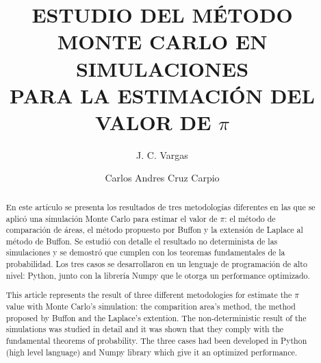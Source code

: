 \documentclass{rbf}
\begin{document}
\title{ESTUDIO DEL MÉTODO MONTE CARLO EN SIMULACIONES \\ PARA LA ESTIMACIÓN DEL VALOR DE \huge $\pi$ \normalsize}

\author{J. C. Vargas\marca{*}}


\author{Carlos Andres Cruz Carpio\marca{**}}
%


\begin{abstract}
\Resumen
En este artículo se presenta los resultados de tres metodologías diferentes en las que se aplicó una simulación Monte Carlo para estimar el valor de $\pi$: el método de comparación de áreas, el método propuesto por Buffon y la extensión de Laplace al método de Buffon. Se estudió con detalle el resultado no determinista de las simulaciones y se demostró que cumplen con los teoremas fundamentales de la probabilidad. Los tres casos se desarrollaron en un lenguaje de programación de alto nivel: Python, junto con la librería Numpy que le otorga un performance optimizado.



\Abstract
This article represents the result of three different metodologies for estimate the $\pi$ value with Monte Carlo's simulation: the comparition area's method, the method proposed by Buffon and the Laplace's extention. The non-deterministic result of the simulations was studied in detail and it was shown that they comply with the fundamental theorems of probability. The three cases had been developed in  Python (high level language) and Numpy library which give it an optimized performance. 

\end{abstract}

\maketitle

\end{document}
